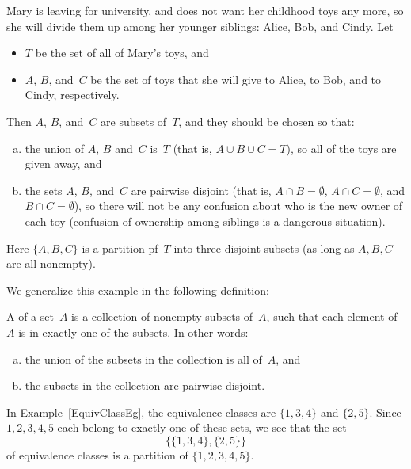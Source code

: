 \begin{eg} \label{ToyPartitionEg}
Mary is leaving for university, and does not want her childhood toys any more, so she will divide them up among her younger siblings: Alice, Bob, and Cindy. Let 
\begin{itemize}
\item $T$ be the set of all of Mary's toys, 
and
\item $A$, $B$, and~$C$ be the set of toys that she will give to Alice, to Bob, and to Cindy, respectively.
\end{itemize}
Then $A$, $B$, and~$C$ are subsets of~$T$, and they should be chosen so that:
\begin{enumerate}[(a)]
\item the union of $A$, $B$ and~$C$ is~$T$ (that is, $A \cup B \cup C = T$), so all of the toys are given away,
and
\item the sets $A$, $B$, and~$C$ are pairwise disjoint (that is, $A \cap B = \emptyset$, $A \cap C = \emptyset$, and $B \cap C = \emptyset$), so there will not be any confusion about who is the new owner of each toy (confusion of ownership among siblings is a dangerous situation).
\end{enumerate}
Here $\{A, B, C\}$ is a  partition pf~$T$ into three disjoint subsets (as long as $A, B, C$ are all nonempty). 
\end{eg}
We generalize this example in the following definition:

\begin{defn}
A  of a set~$A$ is a collection of nonempty subsets of~$A$, such that each element of~$A$ is in exactly one of the subsets. In other words:
\begin{enumerate}[(a)]
\item the union of the subsets in the collection is all of~$A$,
and
\item the subsets in the collection are pairwise disjoint.
\end{enumerate}
\end{defn}


\begin{eg} \label{EquivClassPartEg}
In Example~\ref{EquivClassEg}, the equivalence classes are $\{1,3,4\}$ and $\{2,5\}$. Since $1,2,3,4,5$ each belong to exactly one of these sets, we see that the set
	$$ \bigl\{ \{1,3,4\}, \{2,5\} \bigr\} $$
of equivalence classes is a partition of $\{1,2, 3,4,5\}$.
\end{eg}



